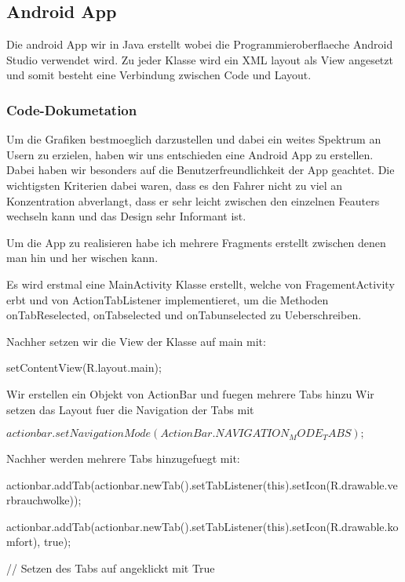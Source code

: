 \subsection{Android App}

Die android App wir in Java erstellt wobei die Programmieroberflaeche Android Studio verwendet wird.
Zu jeder Klasse wird ein XML layout als View angesetzt und somit besteht eine Verbindung zwischen Code und Layout.

\subsubsection{Code-Dokumetation}

 Um die Grafiken bestmoeglich darzustellen und dabei ein weites Spektrum an Usern zu erzielen, haben wir uns entschieden eine Android App zu erstellen.
 Dabei haben wir besonders auf die Benutzerfreundlichkeit der App geachtet.
 Die wichtigsten Kriterien dabei waren, dass es den Fahrer nicht zu viel an Konzentration abverlangt, dass er sehr leicht zwischen den einzelnen Feauters wechseln kann und das Design sehr Informant ist.
 
 Um die App zu realisieren habe ich mehrere Fragments erstellt zwischen denen man hin und her wischen kann.
 


 Es wird erstmal eine MainActivity Klasse erstellt, welche von FragementActivity erbt und von ActionTabListener implementieret, um die Methoden onTabReselected, onTabselected und onTabunselected zu Ueberschreiben.   
 
            
Nachher setzen wir die View der Klasse auf main mit:  
            
setContentView(R.layout.main);

Wir erstellen ein Objekt von ActionBar und fuegen mehrere Tabs hinzu
Wir setzen das Layout fuer die Navigation der Tabs mit
 

$actionbar.setNavigationMode(ActionBar.NAVIGATION_MODE_TABS);$

Nachher werden  mehrere Tabs hinzugefuegt mit:

actionbar.addTab(actionbar.newTab().setTabListener(this).setIcon(R.drawable.verbrauchwolke));

actionbar.addTab(actionbar.newTab().setTabListener(this).setIcon(R.drawable.komfort), true);

// Setzen des Tabs auf angeklickt mit True

